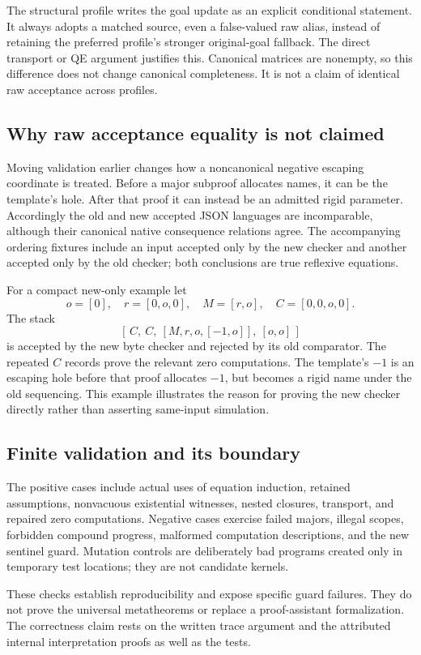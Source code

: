 The structural profile writes the goal update as an explicit conditional
statement. It always adopts a matched source, even a false-valued raw
alias, instead of retaining the preferred profile's stronger original-goal
fallback. The direct transport or QE argument justifies this. Canonical
matrices are nonempty, so this difference does not change canonical
completeness. It is not a claim of identical raw acceptance across profiles.

\subsection{Why raw acceptance equality is not claimed}

Moving validation earlier changes how a noncanonical negative escaping
coordinate is treated. Before a major subproof allocates names, it can
be the template's hole. After that proof it can instead be an admitted
rigid parameter. Accordingly the old and new accepted JSON languages
are incomparable, although their canonical native consequence relations
agree. The accompanying ordering fixtures include an input accepted
only by the new checker and another accepted only by the old checker;
both conclusions are true reflexive equations.

For a compact new-only example let
\[
 o=[0],\quad r=[0,o,0],\quad M=[r,o],\quad C=[0,0,o,0].
\]
The stack
\[
 [\,C,\ C,\ [M,r,o,[-1,o]],\ [o,o]\,]
\]
is accepted by the new byte checker and rejected by its old comparator.
The repeated $C$ records prove the relevant zero computations. The
template's $-1$ is an escaping hole before that proof allocates $-1$,
but becomes a rigid name under the old sequencing. This example
illustrates the reason for proving the new checker directly rather
than asserting same-input simulation.

\subsection{Finite validation and its boundary}

The positive cases include actual uses of equation induction,
retained assumptions, nonvacuous existential witnesses, nested closures,
transport, and repaired zero computations. Negative cases exercise
failed majors, illegal scopes, forbidden compound progress, malformed
computation descriptions, and the new sentinel guard. Mutation controls
are deliberately bad programs created only in temporary test locations;
they are not candidate kernels.

These checks establish reproducibility and expose specific guard failures.
They do not prove the universal metatheorems or replace a proof-assistant
formalization. The correctness claim rests on the written trace argument
and the attributed internal interpretation proofs as well as the tests.
